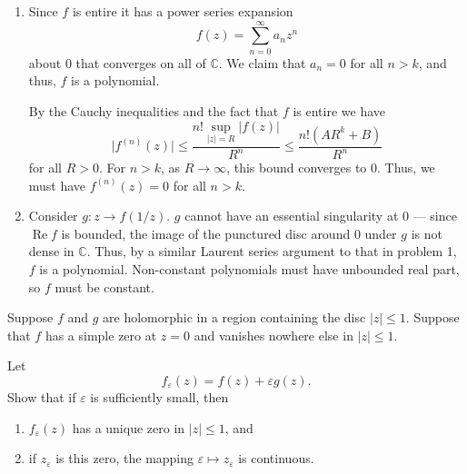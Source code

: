 \documentclass[12 pt, letterpaper]{hmcpset}
\begin{document}
\begin{solution}
	\begin{enumerate}
		\item Since $f$ is entire it has a power series expansion
			\[
				f(z) = \sum_{n = 0}^{\infty} a_{n} z^{n}
			\]
			about $0$ that converges on all of $\mathbb{C}$. We claim that $a_{n} = 0$ for all $n > k$, and thus, $f$ is a polynomial.

			By the Cauchy inequalities and the fact that $f$ is entire we have
			\[
				\lvert f^{(n)}(z) \rvert \le \frac{n! \sup_{\lvert z \rvert = R} \lvert f(z) \rvert}{R^{n}} \le \frac{n! (AR^{k} + B)}{R^{n}}
			\]
			for all $R > 0$. For $n > k$, as $R \to \infty$, this bound converges to $0$. Thus, we must have $f^{(n)}(z) = 0$ for all $n > k$.
		\setcounter{enumi}{3}
		\item Consider $g : z \to f(1/z)$. $g$ cannot have an essential singularity at $0$ --- since $\operatorname{Re} f$ is bounded, the image of the punctured disc around $0$ under $g$ is not dense in $\mathbb{C}$. Thus, by a similar Laurent series argument to that in problem 1, $f$ is a polynomial. Non-constant polynomials must have unbounded real part, so $f$ must be constant.
	\end{enumerate}
\end{solution}

\pagebreak

\begin{problem}[16.]
	Suppose $f$ and $g$ are holomorphic in a region containing the disc $\lvert z \rvert \le 1$. Suppose that $f$ has a simple zero at $z = 0$ and vanishes nowhere else in $\lvert z \rvert \le 1$.

	Let
	\[
		f_{\varepsilon}(z) = f(z) + \varepsilon g(z).
	\]
	Show that if $\varepsilon$ is sufficiently small, then
	\begin{enumerate}
		\item $f_{\varepsilon}(z)$ has a unique zero in $\lvert z \rvert \le 1$, and
		\item if $z_{\varepsilon}$ is this zero, the mapping $\varepsilon \mapsto z_{\varepsilon}$ is continuous.
	\end{enumerate}
\end{problem}
\end{document}
